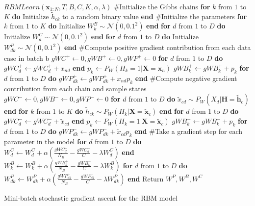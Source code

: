 \documentclass[12pt]{article}
\newcommand{\mbf}[1]{{\mathbf{#1}}}
\begin{document}
\begin{enumerate}
\begin{enumerate}
\begin{algorithm}
\begin{algorithmic}
\STATE $RBMLearn(\mbf{x}_{1:N},T,B,C,K,\alpha,\lambda)$
\STATE \#Initialize the Gibbs chains
\STATE \textbf{for} $k$ from $1$ to $K$ \textbf{do} Initialize $\tilde{h}_{ck}$ to a random binary value \textbf{end}
\ENDFOR
\STATE \#Initialize the parameters
\STATE \textbf{for} $k$ from $1$ to $K$ \textbf{do} Initialize $W^B_{k} \sim \mathcal{N}(0,0.1^2)$ \textbf{end}
\STATE \textbf{for} $d$ from $1$ to $D$ \textbf{do} Initialize $W^C_{d} \sim \mathcal{N}(0,0.1^2)$ \textbf{end}
\STATE \textbf{for} $d$ from $1$ to $D$ \textbf{do} Initialize $W^P_{dk} \sim \mathcal{N}(0,0.1^2)$ \textbf{end}
\ENDFOR
{}
    \STATE \#Compute positive gradient contribution from each data case in batch b
    \STATE $gWC^+ \leftarrow 0, gWB^+ \leftarrow 0, gWP^+\leftarrow 0$
      \STATE  \textbf{for} $d$ from $1$ to $D$ \textbf{do} $gWC_{d}^+ \leftarrow gWC_{d}^+ + x_{nd}$ \textbf{end}
        \STATE  $p_k \leftarrow P_W(H_k=1|\mbf{X}=\mbf{x}_n)$
        \STATE  $gWB_{k}^+ \leftarrow gWB_{k}^+ + p_k$
        \STATE  \textbf{for} $d$ from $1$ to $D$ \textbf{do} $gWP_{dk}^+ \leftarrow gWP_{dk}^+ + x_{nd}p_k$ \textbf{end}
      \ENDFOR
    \ENDFOR
    \STATE \#Compute negative gradient contribution from each chain and sample states
    \STATE $gWC^- \leftarrow 0, gWB^- \leftarrow 0, gWP^-\leftarrow 0$
      \STATE \textbf{for} $d$ from $1$ to $D$ \textbf{do} $\tilde{x}_{cd} \sim P_W(X_d|\mbf{H}=\tilde{\mbf{h}}_c)$ \textbf{end}
      \STATE \textbf{for} $k$ from $1$ to $K$ \textbf{do} $\tilde{h}_{ck} \sim P_W(H_k|\mbf{X}=\tilde{\mbf{x}}_c)$ \textbf{end}
      \STATE  \textbf{for} $d$ from $1$ to $D$ \textbf{do} $gWC_{d}^- \leftarrow gWC_{d}^- + \tilde{x}_{cd}$ \textbf{end}
        \STATE  $p_k \leftarrow P_W(H_k=1|\mbf{X}=\tilde{\mbf{x}}_c)$
        \STATE  $gWB_{k}^- \leftarrow gWB_{k}^- + p_k$
        \STATE  \textbf{for} $d$ from $1$ to $D$ \textbf{do}
            $gWP_{dk}^- \leftarrow gWP_{dk}^- + \tilde{x}_{cd}p_k$ \textbf{end}
      \ENDFOR
    \ENDFOR
      \STATE \#Take a gradient step for each parameter in the model
      \STATE   \textbf{for} $d$ from $1$ to $D$ \textbf{do}  $W^C_d \leftarrow W^C_d +  \alpha\left(\frac{gWC_{d}^+}{N_B} - 
               \frac{gWC_{d}^-}{C} -\lambda W^C_d\right)$ \textbf{end}
        \STATE  $W^B_k \leftarrow W^B_k +  \alpha\left(\frac{gWB_{k}^+}{N_B} - \frac{gWB_{k}^-}{C} -\lambda W^B_k\right)$
        \STATE   \textbf{for} $d$ from $1$ to $D$ \textbf{do}  $W^P_{dk} \leftarrow W^P_{dk} +  \alpha\left(\frac{gWP_{dk}^+}{N_B} - \frac{gWP_{dk}^-}{C} -\lambda W^P_{dk}\right)$ \textbf{end}
      \ENDFOR
  \ENDFOR
\ENDFOR
\STATE Return $W^P,W^B,W^C$
\end{algorithmic}
\caption{Mini-batch stochastic gradient ascent for the RBM model}
\label{learning}
\end{algorithm}


\end{enumerate}
\end{enumerate}
\end{document}
